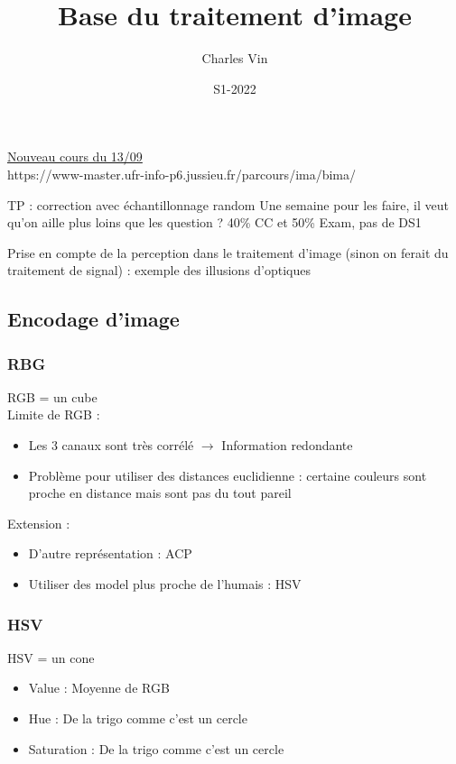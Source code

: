 \documentclass{article}
\title{Base du traitement d'image}
\author{Charles Vin}
\date{S1-2022}
\theoremstyle{plain}%
\theoremstyle{definition}
\theoremstyle{remark}
\begin{document}
\maketitle

\underline{Nouveau cours du 13/09} \\

https://www-master.ufr-info-p6.jussieu.fr/parcours/ima/bima/

TP : correction avec échantillonnage random
Une semaine pour les faire, il veut qu'on aille plus loins que les question ? 
40\% CC et 50\% Exam, pas de DS1 

Prise en compte de la perception dans le traitement d'image (sinon on ferait du traitement de signal) : exemple des illusions d'optiques

\subsection{Encodage d'image}
\subsubsection{RBG}
RGB = un cube \\
Limite de RGB :
\begin{itemize}
    \item Les 3 canaux sont très corrélé $\rightarrow$ Information redondante 
    \item Problème pour utiliser des distances euclidienne : certaine couleurs sont proche en distance mais sont pas du tout pareil
\end{itemize}
Extension : \begin{itemize}
    \item D'autre représentation : ACP 
    \item Utiliser des model plus proche de l'humais : HSV 
\end{itemize}

\subsubsection{HSV}
HSV = un cone 
\begin{itemize}
    \item Value : Moyenne de RGB 
    \item Hue : De la trigo comme c'est un cercle 
    \item Saturation : De la trigo comme c'est un cercle 
\end{itemize}
\end{document}
